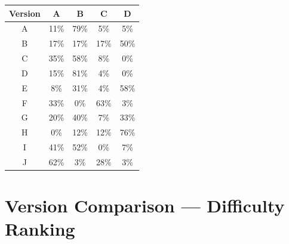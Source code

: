 \documentclass[12pt, a4paper]{article}
\begin{document}
	\begin{table}[H]
		\centering
		\renewcommand{\arraystretch}{1.3}
		\begin{tabular}{ccccc}
			\toprule
			\rowcolor{primary}
			\color{white}\textbf{Version} &
			\color{white}\textbf{A} &
			\color{white}\textbf{B} &
			\color{white}\textbf{C} &
			\color{white}\textbf{D} \\
			\midrule
			\rowcolor{rowA} A & 11\% & 79\% &  5\% &  5\% \\
			\rowcolor{rowB} B & 17\% & 17\% & 17\% & 50\% \\
			\rowcolor{rowA} C & 35\% & 58\% &  8\% &  0\% \\
			\rowcolor{rowB} D & 15\% & 81\% &  4\% &  0\% \\
			\rowcolor{rowA} E &  8\% & 31\% &  4\% & 58\% \\
			\rowcolor{rowB} F & 33\% &  0\% & 63\% &  3\% \\
			\rowcolor{rowA} G & 20\% & 40\% &  7\% & 33\% \\
			\rowcolor{rowB} H &  0\% & 12\% & 12\% & 76\% \\
			\rowcolor{rowA} I & 41\% & 52\% &  0\% &  7\% \\
			\rowcolor{rowB} J & 62\% &  3\% & 28\% &  3\% \\
			\bottomrule
		\end{tabular}
	\end{table}
	
	\section{Version Comparison — Difficulty Ranking}
	
\end{document}
